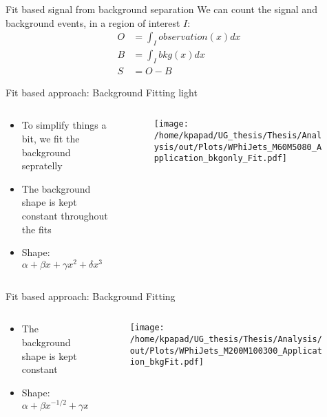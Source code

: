 \documentclass[bigger]{beamer}
\begin{document}
\begin{frame}[label={sec:org335f636}]{Fit based signal from background separation}
We can count the signal and background events, in a region of interest \(I\):
\begin{align}
O &= \int_{I} observation(x) dx \\
B &= \int_{I} bkg(x) dx\\
S &= O - B
\end{align}
\end{frame}
\begin{frame}[label={sec:org963ef61}]{Fit based approach: Background Fitting light}
\begin{columns}
\begin{column}{0.5\columnwidth}
\begin{itemize}
\item To simplify things a bit, we fit the background sepratelly
\item The background shape is kept constant throughout the fits
\item Shape: \(\alpha + \beta x + \gamma x^2 + \delta x^3\)
\end{itemize}
\end{column}
\begin{column}{0.5\columnwidth}
\begin{figure}[h]
\centering
\texttt{[image: /home/kpapad/UG\_thesis/Thesis/Analysis/out/Plots/WPhiJets\_M60M5080\_Application\_bkgonly\_Fit.pdf]}
\end{figure}
\end{column}
\end{columns}
\end{frame}

\begin{frame}[label={sec:org20be653}]{Fit based approach: Background Fitting}
\begin{columns}
\begin{column}{0.5\columnwidth}
\begin{itemize}
\item The background shape is kept constant
\item Shape: \(\alpha + \beta x^{-1/2} + \gamma x^{-1} + \delta x^{3/2}\)
\end{itemize}
\end{column}
\begin{column}{0.5\columnwidth}
\begin{figure}[h]
\centering
\texttt{[image: /home/kpapad/UG\_thesis/Thesis/Analysis/out/Plots/WPhiJets\_M200M100300\_Application\_bkgFit.pdf]}
\end{figure}
\end{column}
\end{columns}
\end{frame}
\end{document}
